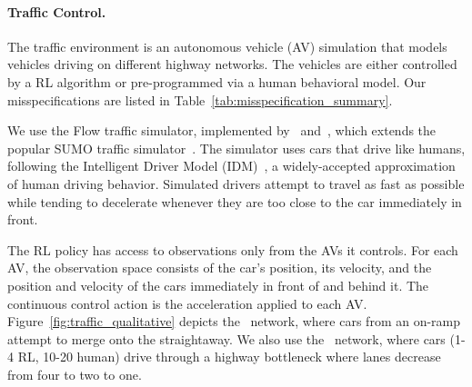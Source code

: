 \paragraph{Traffic Control.}
The traffic environment is an autonomous vehicle (AV) simulation that models vehicles driving on different highway networks. The vehicles are either controlled by a RL algorithm or pre-programmed via a human behavioral model. Our misspecifications are listed in Table~\ref{tab:misspecification_summary}.%

We use the Flow traffic simulator, implemented by~\citet{wu2017flow} and~\citet{vinitsky2018flowbench}, which extends the popular SUMO traffic simulator~\citep{sumo2018}. The simulator uses cars that drive like humans, following the Intelligent Driver Model (IDM)~\citep{treiber2000idm}, a widely-accepted approximation of human driving behavior. Simulated drivers attempt to travel as fast as possible while tending to decelerate whenever they are too close to the car immediately in front. %


The RL policy has access to observations only from the AVs it controls. For each AV, the observation space consists of the car's position, its velocity, and the position and velocity of the cars immediately in front of and behind it. The continuous control action %
is the acceleration applied to each AV. %
Figure~\ref{fig:traffic_qualitative} depicts the \trafficm~network, where cars from an on-ramp attempt to merge onto the straightaway. %
We also use the \trafficb~network, where cars (1-4 RL, 10-20 human) drive through a highway bottleneck where lanes decrease from four to two to one. 


